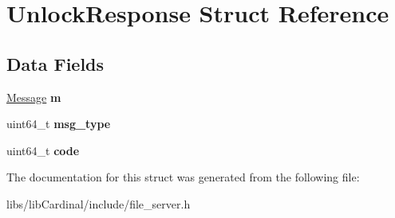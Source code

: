 \hypertarget{structUnlockResponse}{}\section{Unlock\+Response Struct Reference}
\label{structUnlockResponse}
\subsection*{Data Fields}
\begin{DoxyCompactItemize}
\item 
\hyperlink{structMessage}{Message} {\bfseries m}\hypertarget{structUnlockResponse_ab73ce8745bc22fe2d332ae161b4f4270}{}\label{structUnlockResponse_ab73ce8745bc22fe2d332ae161b4f4270}

\item 
uint64\+\_\+t {\bfseries msg\+\_\+type}\hypertarget{structUnlockResponse_a5a0a44c5390e9c39ac860f0bdc36a288}{}\label{structUnlockResponse_a5a0a44c5390e9c39ac860f0bdc36a288}

\item 
uint64\+\_\+t {\bfseries code}\hypertarget{structUnlockResponse_a42f2b6547167c3a3e6e59c4c72424b29}{}\label{structUnlockResponse_a42f2b6547167c3a3e6e59c4c72424b29}

\end{DoxyCompactItemize}


The documentation for this struct was generated from the following file\+:\begin{DoxyCompactItemize}
\item 
libs/lib\+Cardinal/include/file\+\_\+server.\+h\end{DoxyCompactItemize}
